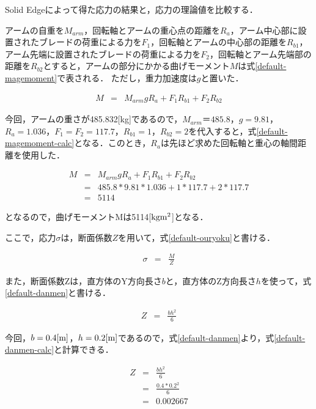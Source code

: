 Solid Edgeによって得た応力の結果と，応力の理論値を比較する．

アームの自重を\(M_{arm}\)，回転軸とアームの重心点の距離を\(R_a\)，アーム中心部に設置されたブレードの荷重による力を\(F_1\)，回転軸とアームの中心部の距離を\(R_{b1}\)，アーム先端に設置されたブレードの荷重による力を\(F_2\)，回転軸とアーム先端部の距離を\(R_{b2}\)とすると，アームの部分にかかる曲げモーメント\(M\)は式\ref{default-magemoment}で表される．
ただし，重力加速度は\(g\)と置いた．

\begin{eqnarray}
  M &=& M_{arm}g R_a + F_1 R_{b1} + F_2 R_{b2} 
  \label{default-magemoment}
\end{eqnarray}

今回，アームの重さが485.832{[}kg{]}であるので，\(M_{arm}＝485.8\)，\(g=9.81\)，\(R_a=1.036\)，\(F_1=F_2=117.7\)，\(R_{b1}=1\)，\(R_{b2}=2\)を代入すると，式\ref{default-magemoment-calc}となる．このとき，\(R_a\)は先ほど求めた回転軸と重心の軸間距離を使用した．

\begin{eqnarray}
  M &=& M_{arm}g R_a + F_1 R_{b1} + F_2 R_{b2}  \nonumber \\
    &=& 485.8*9.81*1.036 + 1*117.7+2*117.7 \nonumber \\
    &=& 5114
  \label{default-magemoment-calc}
\end{eqnarray}

となるので，曲げモーメントMは5114{[}\(\rm kg m^2\){]}となる．

ここで，応力\(\sigma\)は，断面係数\(Z\)を用いて，式\ref{default-ouryoku}と書ける．

\begin{eqnarray}
  \sigma &=& \frac{M}{Z}
  \label{default-ouryoku}
\end{eqnarray}

また，断面係数Zは，直方体のY方向長さ\(b\)と，直方体のZ方向長さ\(h\)を使って，式\ref{default-danmen}と書ける．

\begin{eqnarray}
  Z &=& \frac{bh^2}{6}
  \label{default-danmen}
\end{eqnarray}

今回，\(b=0.4[\rm m]\)，\(h=0.2[\rm m]\)であるので，式\ref{default-danmen}より，式\ref{default-danmen-calc}と計算できる．

\begin{eqnarray}
  Z &=& \frac{bh^2}{6} \nonumber \\
    &=& \frac{0.4*0.2^2}{6} \nonumber \\
    &=& 0.002667
  \label{default-danmen-calc}
\end{eqnarray}

